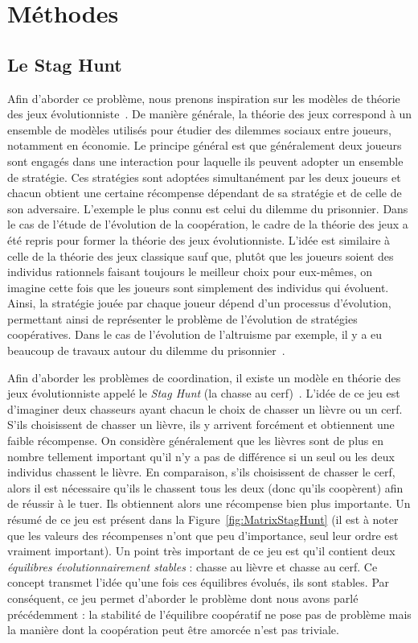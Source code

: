 \section{Méthodes}

	\subsection{Le Stag Hunt}

		Afin d'aborder ce problème, nous prenons inspiration sur les modèles de théorie des jeux évolutionniste~\parencite{MaynardSmith1973}. De manière générale, la théorie des jeux correspond à un ensemble de modèles utilisés pour étudier des dilemmes sociaux entre joueurs, notamment en économie. Le principe général est que généralement deux joueurs sont engagés dans une interaction pour laquelle ils peuvent adopter un ensemble de stratégie. Ces stratégies sont adoptées simultanément par les deux joueurs et chacun obtient une certaine récompense dépendant de sa stratégie et de celle de son adversaire. L'exemple le plus connu est celui du dilemme du prisonnier. Dans le cas de l'étude de l'évolution de la coopération, le cadre de la théorie des jeux a été repris pour former la théorie des jeux évolutionniste. L'idée est similaire à celle de la théorie des jeux classique sauf que, plutôt que les joueurs soient des individus rationnels faisant toujours le meilleur choix pour eux-mêmes, on imagine cette fois que les joueurs sont simplement des individus qui évoluent. Ainsi, la stratégie jouée par chaque joueur dépend d'un processus d'évolution, permettant ainsi de représenter le problème de l'évolution de stratégies coopératives. Dans le cas de l'évolution de l'altruisme par exemple, il y a eu beaucoup de travaux autour du dilemme du prisonnier~\parencite{Axelrod1984}.

		Afin d'aborder les problèmes de coordination, il existe un modèle en théorie des jeux évolutionniste appelé le \emph{Stag Hunt} (la chasse au cerf)~\parencite{Skyrms2004}. L'idée de ce jeu est d'imaginer deux chasseurs ayant chacun le choix de chasser un lièvre ou un cerf. S'ils choisissent de chasser un lièvre, ils y arrivent forcément et obtiennent une faible récompense. On considère généralement que les lièvres sont de plus en nombre tellement important qu'il n'y a pas de différence si un seul ou les deux individus chassent le lièvre. En comparaison, s'ils choisissent de chasser le cerf, alors il est nécessaire qu'ils le chassent tous les deux (donc qu'ils coopèrent) afin de réussir à le tuer. Ils obtiennent alors une récompense bien plus importante. Un résumé de ce jeu est présent dans la Figure~\ref{fig:MatrixStagHunt} (il est à noter que les valeurs des récompenses n'ont que peu d'importance, seul leur ordre est vraiment important). Un point très important de ce jeu est qu'il contient deux \emph{équilibres évolutionnairement stables} : chasse au lièvre et chasse au cerf. Ce concept transmet l'idée qu'une fois ces équilibres évolués, ils sont stables. Par conséquent, ce jeu permet d'aborder le problème dont nous avons parlé précédemment : la stabilité de l'équilibre coopératif ne pose pas de problème mais la manière dont la coopération peut être amorcée n'est pas triviale.

